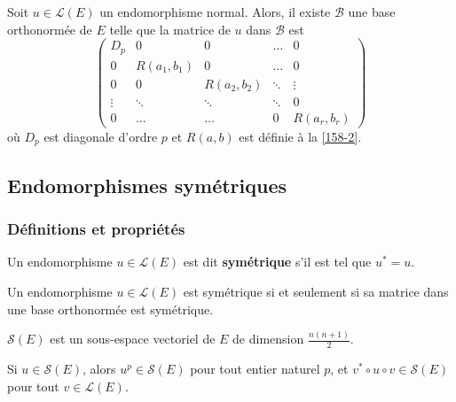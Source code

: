   \begin{theorem}
    Soit $u \in \mathcal{L}(E)$ un endomorphisme normal. Alors, il existe $\mathcal{B}$ une base orthonormée de $E$ telle que la matrice de $u$ dans $\mathcal{B}$ est
    \[ \begin{pmatrix} D_p & 0 & 0 & \dots & 0 \\ 0 & R(a_1,b_1) & 0 & \dots & 0 \\ 0 & 0 & R(a_2,b_2) & \ddots & \vdots \\ \vdots & \ddots & \ddots & \ddots & 0 \\ 0 & \dots & \dots & 0 & R(a_r,b_r) \end{pmatrix} \]
    où $D_p$ est diagonale d'ordre $p$ et $R(a,b)$ est définie à la \cref{158-2}.
  \end{theorem}

  \subsection{Endomorphismes symétriques}

  \label{158-3}

  \subsubsection{Définitions et propriétés}


  \begin{definition}
    Un endomorphisme $u \in \mathcal{L}(E)$ est dit \textbf{symétrique} s'il est tel que $u^* = u$.
  \end{definition}

  \begin{proposition}
    Un endomorphisme $u \in \mathcal{L}(E)$ est symétrique si et seulement si sa matrice dans une base orthonormée est symétrique.
  \end{proposition}

  \begin{corollary}
    $\mathcal{S}(E)$ est un sous-espace vectoriel de $E$ de dimension $\frac{n(n+1)}{2}$.
  \end{corollary}

  \begin{proposition}
    Si $u \in \mathcal{S}(E)$, alors $u^p \in \mathcal{S}(E)$ pour tout entier naturel $p$, et $v^* \circ u \circ v \in \mathcal{S}(E)$ pour tout $v \in \mathcal{L}(E)$.
  \end{proposition}

